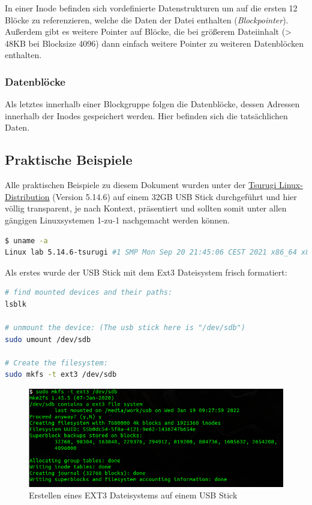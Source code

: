 In einer Inode befinden sich vordefinierte Datenstrukturen um auf die ersten 12 Blöcke zu referenzieren, welche die Daten der Datei enthalten (\textit{Blockpointer}). Außerdem gibt es weitere Pointer auf Blöcke, die bei größerem Dateiinhalt (> 48KB bei Blocksize 4096) dann einfach weitere Pointer zu weiteren Datenblöcken enthalten.

\subsubsection{Datenblöcke}

Als letztes innerhalb einer Blockgruppe folgen die Datenblöcke, dessen Adressen innerhalb der Inodes gespeichert werden. Hier befinden sich die tatsächlichen Daten.


\subsection{Praktische Beispiele}

Alle praktischen Beispiele zu diesem Dokument wurden unter der \href{https://tsurugi-linux.org/}{Tsurugi Linux-Distribution}  (Version 5.14.6) auf einem 32GB USB Stick durchgeführt und hier völlig transparent, je nach Kontext, präsentiert und sollten somit unter allen gängigen Linuxsystemen 1-zu-1 nachgemacht werden können. 

\begin{lstlisting}[language=bash]
$ uname -a
Linux lab 5.14.6-tsurugi #1 SMP Mon Sep 20 21:45:06 CEST 2021 x86_64 x86_64 x86_64 GNU/Li
\end{lstlisting}  

\newpage
	
Als erstes wurde der USB Stick mit dem Ext3 Dateisystem frisch formatiert:

\begin{lstlisting}[language=bash,caption={Create the FS}]
# find mounted devices and their paths:
lsblk

# unmount the device: (The usb stick here is "/dev/sdb")
sudo umount /dev/sdb

# Create the filesystem:
sudo mkfs -t ext3 /dev/sdb
\end{lstlisting}  

\begin{figure}[H]
	\centering
	\includegraphics[width=12cm,keepaspectratio=true]{pictures/createfs.png}
	\caption{
		Erstellen eines EXT3 Dateisystems auf einem USB Stick
	}
	\label{fig:createfs}
\end{figure}

